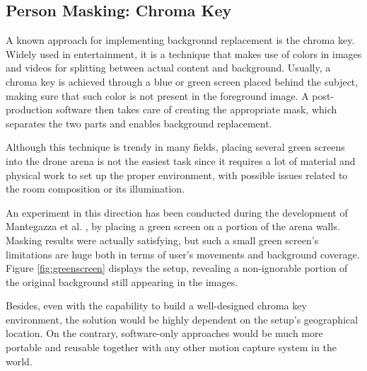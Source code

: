 \subsection{Person Masking: Chroma Key}

A known approach for implementing background replacement is the chroma key. Widely used in entertainment, it is a technique that makes use of colors in images and videos for splitting between actual content and background. Usually, a chroma key is achieved through a blue or green screen placed behind the subject, making sure that such color is not present in the foreground image. A post-production software then takes care of creating the appropriate mask, which separates the two parts and enables background replacement.

Although this technique is trendy in many fields, placing several green screens into the drone arena is not the easiest task since it requires a lot of material and physical work to set up the proper environment, with possible issues related to the room composition or its illumination.

An experiment in this direction has been conducted during the development of Mantegazza et al. \cite{mantegazza2019visionbased}, by placing a green screen on a portion of the arena walls. Masking results were actually satisfying, but such a small green screen's limitations are huge both in terms of user's movements and background coverage. Figure \ref{fig:greenscreen} displays the setup, revealing a non-ignorable portion of the original background still appearing in the images.

Besides, even with the capability to build a well-designed chroma key environment, the solution would be highly dependent on the setup's geographical location. On the contrary, software-only approaches would be much more portable and reusable together with any other motion capture system in the world.

